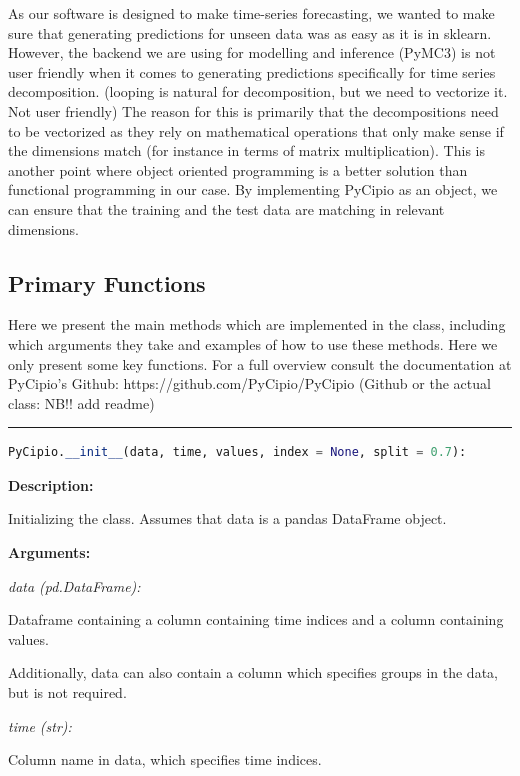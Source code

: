 \documentclass{article}
\begin{document}
As our software is designed to make time-series forecasting, we wanted to make sure that generating predictions for unseen data was as easy as it is in sklearn. However, the backend we are using for modelling and inference (PyMC3) is not user friendly when it comes to generating predictions specifically for time series decomposition. (looping is natural for decomposition, but we need to vectorize it. Not user friendly) The reason for this is primarily that the decompositions need to be vectorized as they rely on mathematical operations that only make sense if the dimensions match (for instance in terms of matrix multiplication). This is another point where object oriented programming is a better solution than functional programming in our case. By implementing PyCipio as an object, we can ensure that the training and the test data are matching in relevant dimensions. 

\subsection{Primary Functions}

Here we present the main methods which are implemented in the class, including which arguments they take and examples of how to use these methods. Here we only present some key functions. For a full overview consult the documentation at PyCipio’s Github: https://github.com/PyCipio/PyCipio (Github or the actual class: NB!! add readme)

\hrule

\begin{lstlisting}[language=Python]
PyCipio.__init__(data, time, values, index = None, split = 0.7):
\end{lstlisting}

\indent \textbf{Description:} 

\indent \indent Initializing the class. Assumes that data is a pandas DataFrame object.

\indent \textbf{Arguments:}

\indent \indent \textit{data (pd.DataFrame):} 

\indent \indent \indent Dataframe containing a column containing time indices and a column containing values. 

\indent \indent \indent Additionally, data can also contain a column which specifies groups in the data, but is not required. 

\indent \indent \textit{time (str):} 

\indent \indent \indent Column name in data, which specifies time indices.
\end{document}
